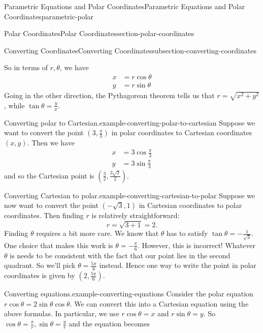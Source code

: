 \documentclass[oneside,10pt,]{book}
\numberwithin{equation}{section}
\newcommand{\amp}{&}
\begin{document}
\begin{chapterptx}{Parametric Equations and Polar Coordinates}{}{Parametric Equations and Polar Coordinates}{}{}{parametric-polar}
\begin{sectionptx}{Polar Coordinates}{}{Polar Coordinates}{}{}{section-polar-coordinates}
\begin{subsectionptx}{Converting Coordinates}{}{Converting Coordinates}{}{}{subsection-converting-coordinates}
\begin{figure}
{\begin{tikzpicture}
\end{tikzpicture}
}
\end{figure}
\hypertarget{p-1020}{}%
So in terms of \(r,\theta\), we have%
%
\begin{align*}
x \amp = r\cos\theta \\
y \amp = r\sin\theta 
\end{align*}
\hypertarget{p-1021}{}%
Going in the other direction, the Pythagorean theorem tells us that \(r = \sqrt{x^{2}+y^{2}}\), while \(\tan\theta = \frac{y}{x}\).%
\begin{example}{Converting polar to Cartesian.}{example-converting-polar-to-cartesian}%
\hypertarget{p-1022}{}%
Suppose we want to convert the point \((3,\frac{\pi}{3})\) in polar coordinates to Cartesian coordinates \((x,y)\). Then we have%
%
\begin{align*}
x \amp = 3\cos\frac{\pi}{3} \\
y \amp = 3\sin\frac{\pi}{3} 
\end{align*}
\hypertarget{p-1023}{}%
and so the Cartesian point is \((\frac{3}{2},\frac{3\sqrt{3}}{2}).\)%
\end{example}
\begin{example}{Converting Cartesian to polar.}{example-converting-cartesian-to-polar}%
\hypertarget{p-1024}{}%
Suppose we now want to convert the point \((-\sqrt{3},1)\) in Cartesian coordinates to polar coordinates. Then finding \(r\) is relatively straightforward:%
%
\begin{equation*}
r = \sqrt{3+1} = 2.
\end{equation*}
\hypertarget{p-1025}{}%
Finding \(\theta\) requires a bit more care. We know that \(\theta\) has to satisfy \(\tan\theta = -\frac{1}{\sqrt{3}}\). One choice that makes this work is \(\theta = -\frac{\pi}{6}\). However, this is incorrect! Whatever \(\theta\) is needs to be consistent with the fact that our point lies in the second quadrant. So we'll pick \(\theta = \frac{5\pi}{6}\) instead. Hence one way to write the point in polar coordinates is given by \((2,\frac{5\pi}{6}).\)%
\end{example}
\begin{example}{Converting equations.}{example-converting-equations}%
\hypertarget{p-1026}{}%
Consider the polar equation \(r\cos\theta = 2\sin\theta\cos\theta\). We can convert this into a Cartesian equation using the above formulas. In particular, we use \(r\cos\theta = x\) and \(r\sin\theta = y\). So \(\cos\theta = \frac{x}{r}, \sin\theta = \frac{y}{r}\) and the equation becomes%
%
\begin{equation*}

\end{equation*}
\end{example}
\end{subsectionptx}
\end{sectionptx}
\end{chapterptx}
\end{document}
